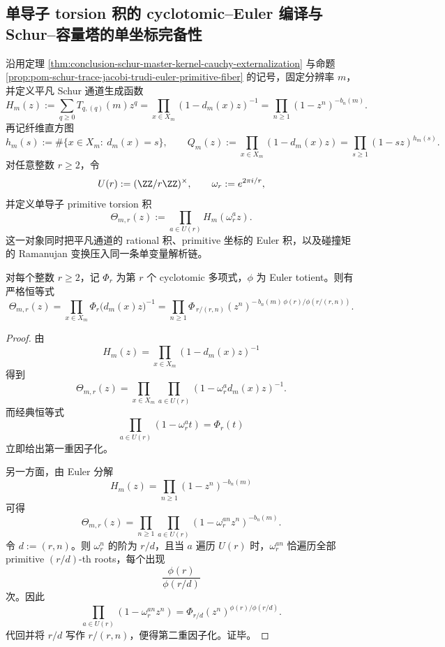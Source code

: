 \subsection{单导子 torsion 积的 cyclotomic--Euler 编译与 Schur--容量塔的单坐标完备性}\label{subsec:conclusion-ramanujan-torsion-schur-capacity-singleconductor}
沿用定理 \ref{thm:conclusion-schur-master-kernel-cauchy-externalization} 与命题 \ref{prop:pom-schur-trace-jacobi-trudi-euler-primitive-fiber} 的记号，固定分辨率 \(m\)，并定义平凡 Schur 通道生成函数
\[
H_m(z):=\sum_{q\ge 0}T_{q,(q)}(m)z^q
=
\prod_{x\in X_m}(1-d_m(x)z)^{-1}
=
\prod_{n\ge 1}(1-z^n)^{-b_n(m)}.
\]
再记纤维直方图
\[
h_m(s):=\#\{x\in X_m:\ d_m(x)=s\},
\qquad
Q_m(z):=\prod_{x\in X_m}(1-d_m(x)z)=\prod_{s\ge 1}(1-sz)^{h_m(s)}.
\]
对任意整数 \(r\ge 2\)，令
\[
U(r):=(\ZZ/r\ZZ)^\times,
\qquad
\omega_r:=e^{2\pi i/r},
\]
并定义单导子 primitive torsion 积
\[
\Theta_{m,r}(z):=\prod_{a\in U(r)}H_m(\omega_r^a z).
\]
这一对象同时把平凡通道的 rational 积、primitive 坐标的 Euler 积，以及碰撞矩的 Ramanujan 变换压入同一条单变量解析链。

\begin{theorem}\label{thm:conclusion-single-conductor-torsion-cyclotomic-euler-factorization}
对每个整数 \(r\ge 2\)，记 \(\Phi_r\) 为第 \(r\) 个 cyclotomic 多项式，\(\phi\) 为 Euler totient。则有严格恒等式
\[
\Theta_{m,r}(z)
=
\prod_{x\in X_m}\Phi_r\!\bigl(d_m(x)z\bigr)^{-1}
=
\prod_{n\ge 1}
\Phi_{\,r/(r,n)}(z^n)^{
-\,b_n(m)\,\phi(r)/\phi(r/(r,n))
}.
\]
\end{theorem}

\begin{proof}
由
\[
H_m(z)=\prod_{x\in X_m}(1-d_m(x)z)^{-1}
\]
得到
\[
\Theta_{m,r}(z)
=
\prod_{x\in X_m}\prod_{a\in U(r)}(1-\omega_r^a d_m(x)z)^{-1}.
\]
而经典恒等式
\[
\prod_{a\in U(r)}(1-\omega_r^a t)=\Phi_r(t)
\]
立即给出第一重因子化。

另一方面，由 Euler 分解
\[
H_m(z)=\prod_{n\ge 1}(1-z^n)^{-b_n(m)}
\]
可得
\[
\Theta_{m,r}(z)
=
\prod_{n\ge 1}\prod_{a\in U(r)}(1-\omega_r^{an}z^n)^{-b_n(m)}.
\]
令 \(d:=(r,n)\)。则 \(\omega_r^n\) 的阶为 \(r/d\)，且当 \(a\) 遍历 \(U(r)\) 时，\(\omega_r^{an}\) 恰遍历全部 primitive \((r/d)\)-th roots，每个出现
\[
\frac{\phi(r)}{\phi(r/d)}
\]
次。因此
\[
\prod_{a\in U(r)}(1-\omega_r^{an}z^n)
=
\Phi_{r/d}(z^n)^{\phi(r)/\phi(r/d)}.
\]
代回并将 \(r/d\) 写作 \(r/(r,n)\)，便得第二重因子化。证毕。
\end{proof}

